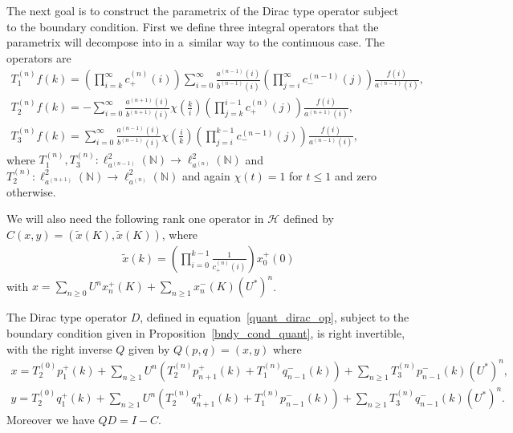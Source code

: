 The next goal is to construct the parametrix of the Dirac type operator subject to the boundary condition.
First we def\/ine three integral operators that the parametrix will decompose into in a~similar way to the continuous
case.
The operators are
\begin{gather}
T_1^{(n)}f(k) = \left(\prod\limits_{i=k}^\infty c_+^{(n)}(i)\right)\sum\limits_{i=0}^\infty
\frac{a^{(n-1)}(i)}{b^{(n-1)}(i)}\left(\prod\limits_{j=i}^\infty c_-^{(n-1)}(j)\right)\frac{f(i)}{a^{(n-1)}(i)},
\nonumber
\\
T_2^{(n)}f(k) = -\sum\limits_{i=0}^\infty\frac{a^{(n+1)}(i)}{b^{(n+1)}(i)}\chi\left(\frac{k}{i}\right)
\left(\prod\limits_{j=k}^{i-1}c_+^{(n)}(j)\right)\frac{f(i)}{a^{(n+1)}(i)},
\nonumber
\\
T_3^{(n)}f(k) = \sum\limits_{i=0}^\infty
\frac{a^{(n-1)}(i)}{b^{(n-1)}(i)}\chi\left(\frac{i}{k}\right)\left(\prod\limits_{j=i}^{k-1}c_-^{(n-1)}(j)\right)\frac{f(i)}{a^{(n-1)}(i)},
\label{int_ops_quant}
\end{gather}
where $T_1^{(n)}, T_3^{(n)}: \ell_{a^{(n-1)}}^2({\mathbb N})\to\ell_{a^{(n)}}^2({\mathbb N})$ and $T_2^{(n)}:
\ell_{a^{(n+1)}}^2({\mathbb N}) \to \ell_{a^{(n)}}^2({\mathbb N})$ and again $\chi(t)=1$ for $t\le1$ and zero otherwise.

We will also need the following rank one operator in $\mathcal{H}$ def\/ined by $C(x,y) = (\tilde x(K),\tilde x(K))$,
where
\begin{gather*}
\tilde x(k) = \left(\prod\limits_{i=0}^{k-1}\frac{1}{c_+^{(n)}(i)}\right)x_0^+(0)
\end{gather*}
with $x= \sum\limits_{n\ge0} U^n x_n^+(K) + \sum\limits_{n\ge1} x_n^-(K)(U^*)^n$.

\begin{prop}
\label{quant_para}
The Dirac type operator $D$, defined in equation~\eqref{quant_dirac_op}, subject to the boundary condition given in
Proposition~{\rm \ref{bndy_cond_quant}}, is right invertible, with the right inverse $Q$ given by $Q(p,q)=({x},{y})$ where
\begin{gather*}
{x} = T_2^{(0)}p_1^+(k) + \sum\limits_{n\ge 1}U^n\left(T_2^{(n)}p_{n+1}^+(k) + T_1^{(n)}q_{n-1}^-(k)\right) +
\sum\limits_{n\ge1} T_3^{(n)}p_{n-1}^-(k)(U^*)^n,
\\
{y} = T_2^{(0)}q_1^+(k) + \sum\limits_{n\ge 1}U^n\left(T_2^{(n)}q_{n+1}^+(k) + T_1^{(n)}p_{n-1}^-(k)\right) +
\sum\limits_{n\ge1} T_3^{(n)}q_{n-1}^-(k)(U^*)^n.
\end{gather*}
Moreover we have $QD = I - C$.
\end{prop}

